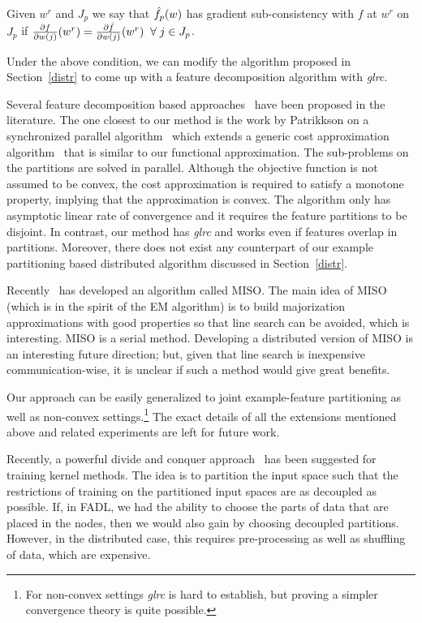 \documentclass[twoside, 11pt]{article}
\begin{document}
 Given $w^r$ and $J_p$ we say that $\hat{f}_p(w)$ has gradient sub-consistency with $f$ at $w^r$ on $J_p$ if $\frac{\partial f}{\partial w(j)} (w^r) = \frac{\partial \hat{f}}{\partial w(j)} (w^r) \;\; \forall \; j\in J_p$.

Under the above condition, we can modify the algorithm proposed in Section~\ref{distr} to come up with a feature decomposition algorithm with {\it glrc}.

Several feature decomposition based approaches~\citep{richtarik2013,patriksson1998fp} have been proposed in the literature. The one closest to our method is the work by Patrikkson on a synchronized parallel algorithm~\citep{patriksson1998fp} which extends a generic cost approximation algorithm~\citep{patriksson1998ca} that is similar to our functional approximation. The sub-problems on the partitions are solved in parallel. Although the objective function is not assumed to be convex, the cost approximation is required to satisfy a monotone property, implying that the approximation is convex. The algorithm only has asymptotic linear rate of convergence and it requires the feature partitions to be disjoint. In contrast, our method has {\it glrc} and works even if features overlap in partitions. Moreover, there does not exist any counterpart of our example partitioning based distributed algorithm discussed in Section~\ref{distr}.

Recently~\citet{mairal2013} has developed an algorithm called MISO. The main idea of MISO (which is in the spirit of the EM algorithm) is to build majorization approximations with good properties so that line search can be avoided, which is interesting. MISO is a serial method. Developing a distributed version of MISO is an interesting future direction; but, given that line search is inexpensive communication-wise, it is unclear if such a method would give great benefits.

Our approach can be easily generalized to joint example-feature partitioning as well as non-convex settings.\footnote{For non-convex settings {\it glrc} is hard to establish, but proving a simpler convergence theory is quite possible.} The exact details of all the extensions mentioned above and related experiments are left for future work.


Recently, a powerful divide and conquer approach~\citet{hsieh14} has been suggested for training kernel methods. The idea is to partition the input space such that the restrictions of training on the partitioned input spaces are as decoupled as possible. If, in FADL, we had the ability to choose the parts of data that are placed in the nodes, then we would also gain by choosing decoupled partitions. However, in the distributed case, this requires pre-processing as well as shuffling of data, which are expensive.
\end{document}
